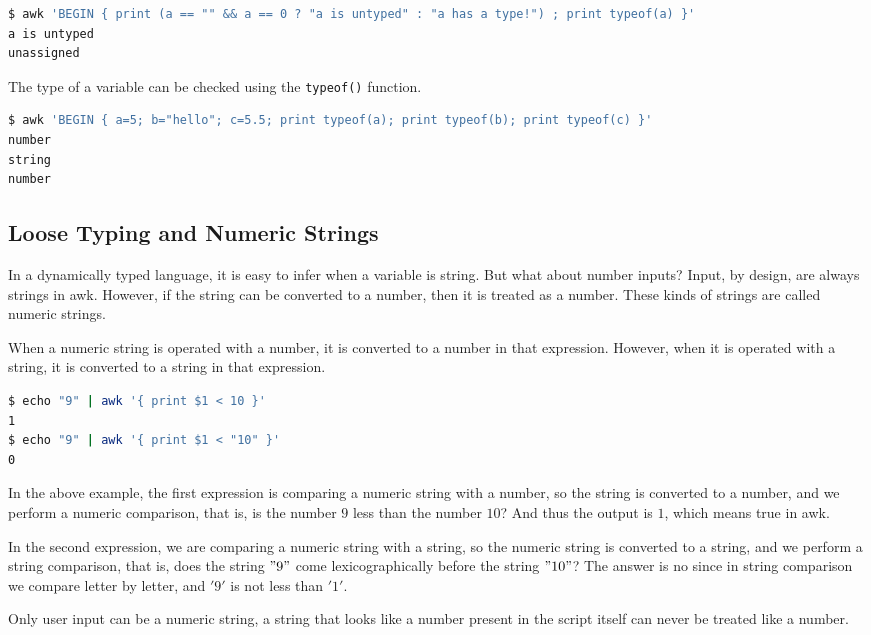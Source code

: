 \begin{lstlisting}[language=bash]
$ awk 'BEGIN { print (a == "" && a == 0 ? "a is untyped" : "a has a type!") ; print typeof(a) }'
a is untyped
unassigned
\end{lstlisting}

The type of a variable can be checked using the \lstinline|typeof()| function.

\begin{lstlisting}[language=bash]
$ awk 'BEGIN { a=5; b="hello"; c=5.5; print typeof(a); print typeof(b); print typeof(c) }'
number
string
number
\end{lstlisting}

\subsection{Loose Typing and Numeric Strings}

In a dynamically typed language, it is easy to infer when a variable is string. But what about number inputs?
Input, by design, are always strings in awk. However, if the string can be converted to a number, then it is treated as a number.
These kinds of strings are called numeric strings.

When a numeric string is operated with a number, it is converted to a number in that expression.
However, when it is operated with a string, it is converted to a string in that expression.

\begin{lstlisting}[language=bash]
$ echo "9" | awk '{ print $1 < 10 }'
1
$ echo "9" | awk '{ print $1 < "10" }'
0
\end{lstlisting}

In the above example, the first expression is comparing a numeric string with a number, so the string is converted to a number, and we perform a numeric comparison, that is, is the number $9$ less than the number $10$?
And thus the output is $1$, which means true in awk.

In the second expression, we are comparing a numeric string with a string, so the numeric string is converted to a string, and we perform a string comparison, that is, does the string $"9"$ come lexicographically before the string $"10"$? The answer is no since in string comparison we compare letter by letter, and $'9'$ is not less than $'1'$.

Only user input can be a numeric string, a string that looks like a number present in the script itself can never be treated like a number.

